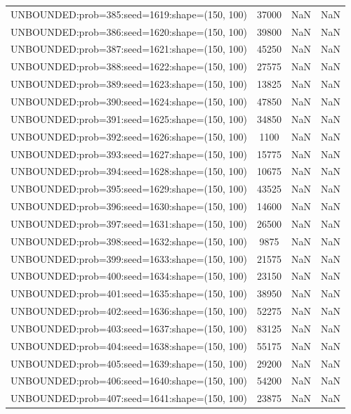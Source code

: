 \begin{longtable}{lccc}
UNBOUNDED:prob=385:seed=1619:shape=(150, 100) & 37000 &   NaN &    NaN \\
UNBOUNDED:prob=386:seed=1620:shape=(150, 100) & 39800 &   NaN &    NaN \\
UNBOUNDED:prob=387:seed=1621:shape=(150, 100) & 45250 &   NaN &    NaN \\
UNBOUNDED:prob=388:seed=1622:shape=(150, 100) & 27575 &   NaN &    NaN \\
UNBOUNDED:prob=389:seed=1623:shape=(150, 100) & 13825 &   NaN &    NaN \\
UNBOUNDED:prob=390:seed=1624:shape=(150, 100) & 47850 &   NaN &    NaN \\
UNBOUNDED:prob=391:seed=1625:shape=(150, 100) & 34850 &   NaN &    NaN \\
UNBOUNDED:prob=392:seed=1626:shape=(150, 100) &  1100 &   NaN &    NaN \\
UNBOUNDED:prob=393:seed=1627:shape=(150, 100) & 15775 &   NaN &    NaN \\
UNBOUNDED:prob=394:seed=1628:shape=(150, 100) & 10675 &   NaN &    NaN \\
UNBOUNDED:prob=395:seed=1629:shape=(150, 100) & 43525 &   NaN &    NaN \\
UNBOUNDED:prob=396:seed=1630:shape=(150, 100) & 14600 &   NaN &    NaN \\
UNBOUNDED:prob=397:seed=1631:shape=(150, 100) & 26500 &   NaN &    NaN \\
UNBOUNDED:prob=398:seed=1632:shape=(150, 100) &  9875 &   NaN &    NaN \\
UNBOUNDED:prob=399:seed=1633:shape=(150, 100) & 21575 &   NaN &    NaN \\
UNBOUNDED:prob=400:seed=1634:shape=(150, 100) & 23150 &   NaN &    NaN \\
UNBOUNDED:prob=401:seed=1635:shape=(150, 100) & 38950 &   NaN &    NaN \\
UNBOUNDED:prob=402:seed=1636:shape=(150, 100) & 52275 &   NaN &    NaN \\
UNBOUNDED:prob=403:seed=1637:shape=(150, 100) & 83125 &   NaN &    NaN \\
UNBOUNDED:prob=404:seed=1638:shape=(150, 100) & 55175 &   NaN &    NaN \\
UNBOUNDED:prob=405:seed=1639:shape=(150, 100) & 29200 &   NaN &    NaN \\
UNBOUNDED:prob=406:seed=1640:shape=(150, 100) & 54200 &   NaN &    NaN \\
UNBOUNDED:prob=407:seed=1641:shape=(150, 100) & 23875 &   NaN &    NaN \\

\end{longtable}
